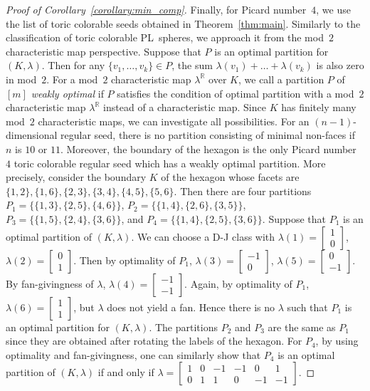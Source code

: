\documentclass[11pt]{amsart}
\theoremstyle{plain}
\numberwithin{equation}{section}
\theoremstyle{definition}
\newcommand{\R}{\mathbb{R}}
\begin{document}
\begin{proof}[Proof of Corollary~\ref{corollary:min_comp}]
	Finally, for Picard number~$4$, we use the list of toric colorable seeds obtained in Theorem~\ref{thm:main}.
	Similarly to the classification of toric colorable PL~spheres, we approach it from the mod~$2$ characteristic map perspective.
	Suppose that $P$ is an optimal partition for $(K, \lambda)$.
	Then for any $\{v_1, \ldots, v_k \} \in P$, the sum $\lambda(v_1) + \dots + \lambda(v_k)$ is also zero in mod~$2$.
	For a mod~$2$ characteristic map $\lambda^\R$ over $K$, we call a partition $P$ of $[m]$ \emph{weakly  optimal} if $P$ satisfies the condition of optimal partition with a mod~$2$ characteristic map $\lambda^\R$ instead of a characteristic map.
	Since $K$ has finitely many mod~$2$ characteristic maps, we can investigate all possibilities.
	For an $(n-1)$-dimensional regular seed, there is no partition consisting of minimal non-faces if $n$ is $10$ or $11$.
	Moreover, the boundary of the hexagon is the only Picard number~$4$ toric colorable regular seed which has a weakly optimal partition.
	More precisely, consider the boundary $K$ of the hexagon whose facets are $\{1,2\}, \{1,6\}, \{2,3\}, \{3,4\}, \{4,5\}, \{5,6\}$.
	Then there are four partitions $P_1 = \{\{1, 3\}, \{2, 5\}, \{4, 6\}\}$, $P_2 = \{\{1, 4\}, \{2, 6\}, \{3, 5\}\}$, $P_3=\{\{1, 5\}, \{2, 4\}, \{3, 6\}\}$, and $P_4 = \{\{1, 4\}, \{2, 5\}, \{3, 6\}\}$.
	Suppose that $P_1$ is an optimal partition of $(K, \lambda)$.
	We can choose a D-J class with $\lambda(1) = \begin{bmatrix}
		1 \\
		0
	\end{bmatrix}$, $\lambda(2) = \begin{bmatrix}
		0 \\
		1
	\end{bmatrix}$.
	Then by optimality of $P_1$, $\lambda(3) = \begin{bmatrix}
		-1 \\
		0
	\end{bmatrix}$, $\lambda(5) = \begin{bmatrix}
		0 \\
		-1
	\end{bmatrix}$.
	By fan-givingness of $\lambda$, $\lambda(4) = \begin{bmatrix}
		-1 \\
		-1
	\end{bmatrix}$.
	Again, by optimality of $P_1$, $\lambda(6) = \begin{bmatrix}
		1 \\
		1
	\end{bmatrix}$, but $\lambda$ does not yield a fan.
	Hence there is no $\lambda$ such that $P_1$ is an optimal partition for $(K, \lambda)$.
	The partitions $P_2$ and $P_3$ are the same as $P_1$ since they are obtained after rotating the labels of the hexagon.
	For $P_4$, by using optimality and fan-givingness, one can similarly show that $P_4$ is an optimal partition of $(K, \lambda)$ if and only if $\lambda = \begin{bmatrix}
		1 & 0 & -1 & -1 & 0 & 1 \\
		0 & 1 & 1 & 0 & -1 & -1
	\end{bmatrix}$.
	

\end{proof}
\end{document}
